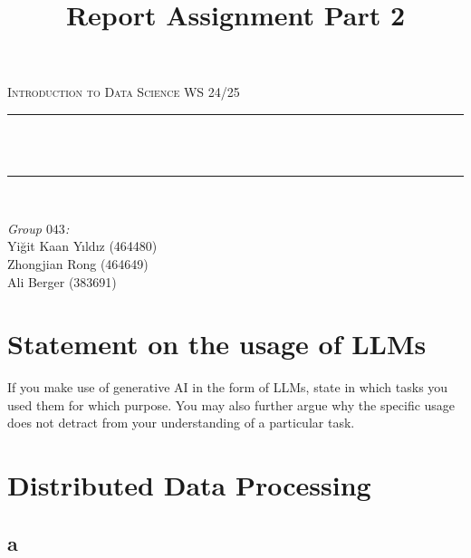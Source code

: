 \documentclass[12pt]{report}
\title{Report Assignment Part 2}
\author{}
\date{}
\makeatletter
\let\thetitle\@title
\makeatother
\begin{document}

    \begin{titlepage}
        \centering
        \vspace*{0.5 cm}
        \begin{center}
            \textsc{\Large Introduction to Data Science WS 24/25}\\[2.0 cm]
        \end{center}
        \rule{\linewidth}{0.2 mm} \\[0.4 cm]
        { \huge \bfseries \thetitle}\\
        \rule{\linewidth}{0.2 mm} \\[1.5 cm]

        \begin{flushright}
            \large
            \emph{Group $043$:} \\
            Yiğit Kaan Yıldız (464480) \\
            Zhongjian Rong (464649) \\
            Ali Berger (383691)
        \end{flushright}

    \end{titlepage}


     \section*{Statement on the usage of LLMs}
     \textlangle If you make use of generative AI in the form of LLMs, state in which tasks you used them for which purpose.
     You may also further argue why the specific usage does not detract from your understanding of a particular task. \textrangle

     \newpage

    \section{Distributed Data Processing}
    	\subsection{a}
\inputminted[fontsize=\tiny]{python}{ distributed_data_processing/best_movies.py  }

\end{document}
